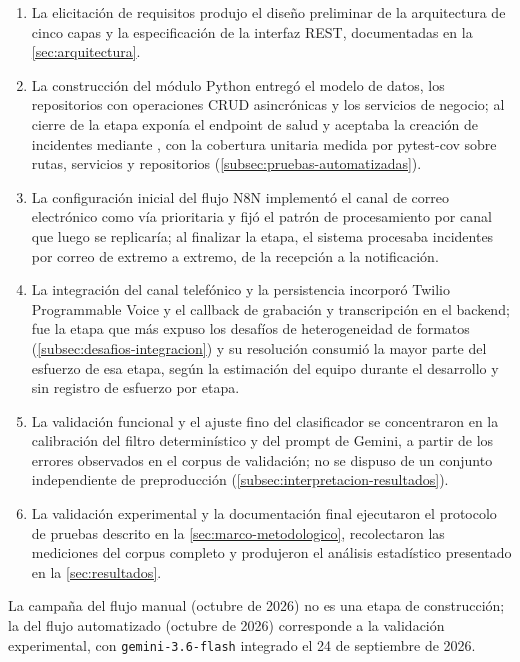 \begin{enumerate}[label=Etapa \arabic*:, leftmargin=*]
  \item La elicitación de requisitos produjo el diseño preliminar de la arquitectura de cinco capas y la especificación de la interfaz REST, documentadas en la \autoref{sec:arquitectura}.
  \item La construcción del módulo Python entregó el modelo de datos, los repositorios con operaciones CRUD asincrónicas y los servicios de negocio; al cierre de la etapa exponía el endpoint de salud y aceptaba la creación de incidentes mediante , con la cobertura unitaria medida por pytest-cov sobre rutas, servicios y repositorios (\autoref{subsec:pruebas-automatizadas}).
  \item La configuración inicial del flujo N8N implementó el canal de correo electrónico como vía prioritaria y fijó el patrón de procesamiento por canal que luego se replicaría; al finalizar la etapa, el sistema procesaba incidentes por correo de extremo a extremo, de la recepción a la notificación.
  \item La integración del canal telefónico y la persistencia incorporó Twilio Programmable Voice y el callback de grabación y transcripción en el backend; fue la etapa que más expuso los desafíos de heterogeneidad de formatos (\autoref{subsec:desafios-integracion}) y su resolución consumió la mayor parte del esfuerzo de esa etapa, según la estimación del equipo durante el desarrollo y sin registro de esfuerzo por etapa.
  \item La validación funcional y el ajuste fino del clasificador se concentraron en la calibración del filtro determinístico y del prompt de Gemini, a partir de los errores observados en el corpus de validación; no se dispuso de un conjunto independiente de preproducción (\autoref{subsec:interpretacion-resultados}).
  \item La validación experimental y la documentación final ejecutaron el protocolo de pruebas descrito en la \autoref{sec:marco-metodologico}, recolectaron las mediciones del corpus completo y produjeron el análisis estadístico presentado en la \autoref{sec:resultados}.
\end{enumerate}

La campaña del flujo manual (octubre de 2026) no es una etapa de construcción; la del flujo automatizado (octubre de 2026) corresponde a la validación experimental, con \texttt{gemini-3.6-flash} integrado el 24 de septiembre de 2026.

